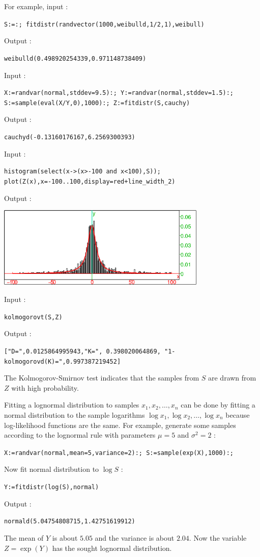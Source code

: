 \documentclass[a4paper,11pt]{book}
\begin{document}
For example, input :
\begin{center}
  \tt S:=:; fitdistr(randvector(1000,weibulld,1/2,1),weibull)
\end{center}
Output :
\begin{center}
  \tt weibulld(0.498920254339,0.971148738409)
\end{center}
Input :
\begin{center}
  \tt X:=randvar(normal,stddev=9.5):; Y:=randvar(normal,stddev=1.5):; S:=sample(eval(X/Y,0),1000):; Z:=fitdistr(S,cauchy)
\end{center}
Output :
\begin{center}
  \tt cauchyd(-0.13160176167,6.2569300393)
\end{center}
Input :
\begin{center}
  \tt histogram(select(x->(x>-100 and x<100),S)); plot(Z(x),x=-100..100,display=red+line\_width\_2)
\end{center}
Output :
\begin{center}
  \includegraphics[width=0.75\textwidth]{fitdistr.png}
\end{center}
Input :
\begin{center}
  \tt kolmogorovt(S,Z)
\end{center}
Output :
\begin{center}
  \tt ["D=",0.0125864995943,"K=", 0.398020064869, "1-kolmogorovd(K)=",0.997387219452]
\end{center}
The Kolmogorov-Smirnov test indicates that the samples from $S$ are drawn from $Z$ with high probability.

Fitting a lognormal distribution to samples $x_1,x_2,\dots,x_n$ can be done by fitting a normal distribution to the sample logarithms $\log x_1,\log x_2,\dots,\log x_n$ because log-likelihood functions are the same. For example, generate some samples according to the lognormal rule with parameters $\mu=5$ and $\sigma^2=2$ :
\begin{center}
  \tt X:=randvar(normal,mean=5,variance=2):; S:=sample(exp(X),1000):;
\end{center}
Now fit normal distribution to $\log S$ :
\begin{center}
  \tt Y:=fitdistr(log(S),normal)
\end{center}
Output :
\begin{center}
  \tt normald(5.04754808715,1.42751619912)
\end{center}
The mean of $Y$ is about $5.05$ and the variance is about $2.04$. Now the variable $Z=\exp(Y)$ has the sought lognormal distribution.
\end{document}
